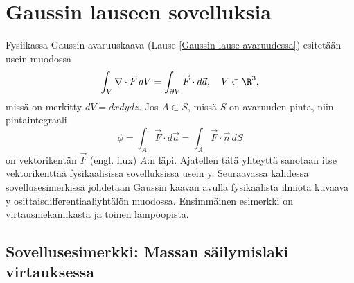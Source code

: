 \section{Gaussin lauseen sovelluksia} \label{Gaussin lauseen sovelluksia}
\alku

Fysiikassa Gaussin avaruuskaava (Lause \ref{Gaussin lause avaruudessa}) esitetään usein
muodossa
\[
\int_V \nabla\cdot\vec F\,dV=\int_{\partial V} \vec F\cdot d\vec a,\quad V\subset\R^3,
\]
missä on merkitty $dV=dxdydz$. Jos $A \subset S$, missä $S$ on avaruuden pinta, niin
pintaintegraali
\begin{equation} \label{vuokaava}
\phi=\int_A \vec F\cdot d\vec a = \int_A \vec F\cdot\vec n\,dS \tag{$\star$}
\end{equation}
%
on vektorikentän $\vec F$  (engl. flux) $A$:n läpi. Ajatellen tätä yhteyttä
sanotaan itse vektorikenttää fysikaalisissa sovelluksissa usein y.
Seuraavassa kahdessa sovellusesimerkissä johdetaan Gaussin kaavan avulla fysikaalista ilmiötä
kuvaava y osittaisdifferentiaaliyhtälön muodossa. Ensimmäinen esimerkki
on virtausmekaniikasta ja toinen lämpöopista.

\subsection{Sovellusesimerkki: Massan säilymislaki virtauksessa}

